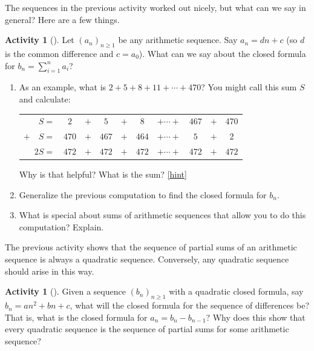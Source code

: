 \documentclass[10pt,]{book}
\theoremstyle{plain}
\theoremstyle{definition}
\theoremstyle{definition}
\theoremstyle{definition}
\newtheorem{activity}[project]{Activity}
\numberwithin{equation}{chapter}
\newcommand{\hrulethin}  {\noalign{\hrule height 0.04em}}
\begin{document}
\hypertarget{p-935}{}%
The sequences in the previous activity worked out nicely, but what can we say in general?  Here are a few things.%
\begin{activity}[]\label{activity-139}
\hypertarget{p-936}{}%
Let \((a_n)_{n \ge 1}\) be any arithmetic sequence.  Say \(a_n = dn + c\) (so \(d\) is the common difference and \(c = a_0\)).  What can we say about the closed formula for \(b_n = \sum_{i=1}^n a_i\)?%
\begin{enumerate}[font=\bfseries,label=(\alph*),ref=\alph*]
\item\label{task-177} \hypertarget{p-937}{}%
As an example, what is \(2+5+8+11+\cdots + 470\)?  You might call this sum \(S\) and calculate:%
\begin{sidebyside}{1}{0}{0}{0}
\begin{sbspanel}{1}
{\centering%
\begin{tabular}{rccccccccc}
\(S  =\)&\(2\)&\(+\)&\(5\)&\(+\)&\(8\)&\(+ \cdots +\)&\(467\)&\(+\)&470\tabularnewline[0pt]
\(+ \quad S  =\)&\(470\)&\(+\)&\(467\)&\(+\)&\(464\)&\(+ \cdots +\)&\(5\)&\(+\)&2\tabularnewline\hrulethin
\(2S  =\)&\(472\)&\(+\)&\(472\)&\(+\)&\(472\)&\(+ \cdots +\)&\(472\)&\(+\)&\(472\)
\end{tabular}
\par}
\end{sbspanel}
\end{sidebyside}
\par
\hypertarget{p-938}{}%
Why is that helpful?  What is the sum?%
\hfill{\tiny\hyperlink{a-146.a}{[hint]}\hypertarget{q-146.a}{}}\item\label{task-178} \hypertarget{p-940}{}%
Generalize the previous computation to find the closed formula for \(b_n\).%
\item\label{task-179} \hypertarget{p-941}{}%
What is special about sums of arithmetic sequences that allow you to do this computation?  Explain.%
\end{enumerate}
\end{activity}
\hypertarget{p-942}{}%
The previous activity shows that the sequence of partial sums of an arithmetic sequence is always a quadratic sequence.  Conversely, any quadratic sequence should arise in this way.%
\begin{activity}[]\label{activity-140}
\hypertarget{p-943}{}%
Given a sequence \((b_n)_{n \ge 1}\) with a quadratic closed formula, say \(b_n = an^2 + bn + c\), what will the closed formula for the sequence of differences be?  That is, what is the closed formula for \(a_n = b_n - b_{n-1}\)?  Why does this show that every quadratic sequence is the sequence of partial sums for some arithmetic sequence?%
\end{activity}
\end{document}

